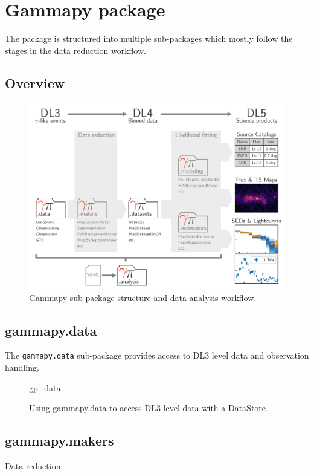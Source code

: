 \section{Gammapy package}
\label{sec:package}

The \gammapy package is structured into multiple sub-packages
which mostly follow the stages in the data reduction workflow.


\subsection{Overview}
\begin{figure}[t]
\centering
\includegraphics[width=1.\textwidth]{static/data-flow-gammapy}
\caption{
Gammapy sub-package structure and data analysis workflow.
}
\label{fig:workflow}
\end{figure}


\subsection{gammapy.data}
The \verb|gammapy.data| sub-package provides access to
DL3 level data and observation handling.


\begin{figure}

{gp_data}

\caption{Using gammapy.data to access DL3 level data with a DataStore}
\label{fig*:minted}
\end{figure}



\subsection{gammapy.makers}
Data reduction

